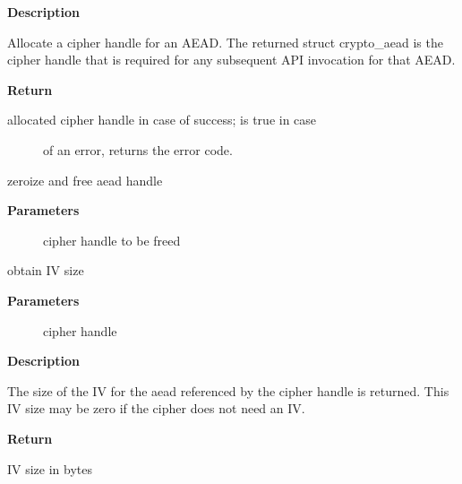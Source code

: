 \documentclass[a4paper,8pt,english]{sphinxmanual}
\begin{document}
\textbf{Description}

Allocate a cipher handle for an AEAD. The returned struct
crypto\_aead is the cipher handle that is required for any subsequent
API invocation for that AEAD.

\textbf{Return}
\begin{description}
\item[{allocated cipher handle in case of success;  is true in case}] \leavevmode
of an error,  returns the error code.

\end{description}

\begin{fulllineitems}
\label{crypto/api-aead:c.crypto_free_aead}
zeroize and free aead handle

\end{fulllineitems}


\textbf{Parameters}
\begin{description}
\item[{}] \leavevmode
cipher handle to be freed

\end{description}

\begin{fulllineitems}
\label{crypto/api-aead:c.crypto_aead_ivsize}
obtain IV size

\end{fulllineitems}


\textbf{Parameters}
\begin{description}
\item[{}] \leavevmode
cipher handle

\end{description}

\textbf{Description}

The size of the IV for the aead referenced by the cipher handle is
returned. This IV size may be zero if the cipher does not need an IV.

\textbf{Return}

IV size in bytes
\end{document}
